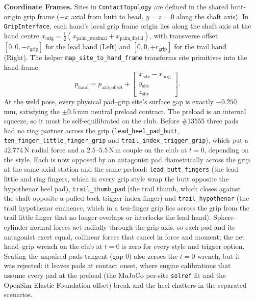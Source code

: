 \documentclass[11pt,a4paper]{article}
\begin{document}
\textbf{Coordinate Frames.} Sites in \texttt{ContactTopology} are defined in the shared butt-origin grip frame ($+x$ axial from butt to head,
$y=z=0$ along the shaft axis). In \texttt{GripInterface}, each hand's local grip frame origin lies along the shaft axis at the hand centre
$x_{\mathrm{orig}} = \frac{1}{2}(x_{\mathrm{palm\_proximal}} + x_{\mathrm{palm\_distal}})$, with transverse offset $[0, 0, -r_{\mathrm{grip}}]$
for the lead hand (Left) and $[0, 0, +r_{\mathrm{grip}}]$ for the trail hand (Right).
The helper \texttt{map\_site\_to\_hand\_frame} transforms site primitives into the hand frame:
\begin{equation}
p_{\mathrm{hand}} = p_{\mathrm{axis\_offset}} + \begin{bmatrix} x_{\mathrm{site}} - x_{\mathrm{orig}} \\ y_{\mathrm{site}} \\ z_{\mathrm{site}} \end{bmatrix}.
\end{equation}
At the weld pose, every physical pad--grip site's surface gap is exactly $-0.250$\,mm, satisfying the $\pm 0.5$\,mm neutral preload contract. The preload is an internal squeeze, so it must be self-equilibrated on the club. Before \#13555 three pads had no ring partner across the grip (\texttt{lead\_heel\_pad\_butt}, \texttt{ten\_finger\_little\_finger\_grip} and \texttt{trail\_index\_trigger\_grip}), which put a $42.774$\,N radial force and a $2.5$--$5.5$\,N\,m couple on the club at $t = 0$, depending on the style. Each is now opposed by an antagonist pad diametrically across the grip at the same axial station and the same preload: \texttt{lead\_butt\_fingers} (the lead little and ring fingers, which in every grip style wrap the butt opposite the hypothenar heel pad), \texttt{trail\_thumb\_pad} (the trail thumb, which closes against the shaft opposite a pulled-back trigger index finger) and \texttt{trail\_hypothenar} (the trail hypothenar eminence, which in a ten-finger grip lies across the grip from the trail little finger that no longer overlaps or interlocks the lead hand). Sphere--cylinder normal forces act radially through the grip axis, so each pad and its antagonist exert equal, collinear forces that cancel in force and moment; the net hand--grip wrench on the club at $t = 0$ is zero for every style and trigger option. Seating the unpaired pads tangent (gap $0$) also zeroes the $t = 0$ wrench, but it was rejected: it leaves pads at contact onset, where engine calibrations that assume every pad at the preload (the MuJoCo per-site \texttt{solref} fit and the OpenSim Elastic Foundation offset) break and the heel chatters in the separated scenarios.
\end{document}
